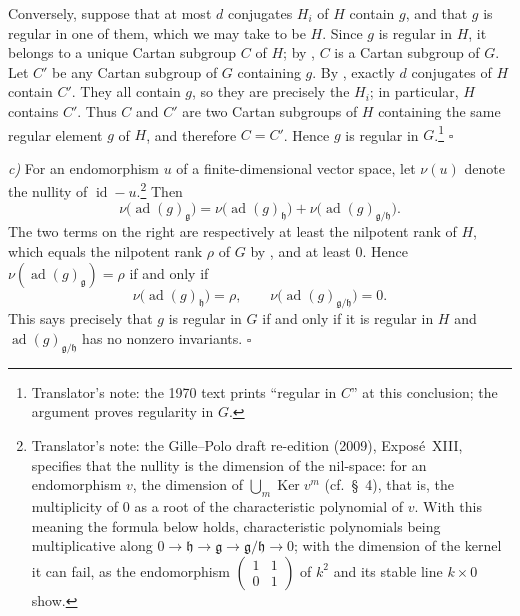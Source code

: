 Conversely, suppose that at most \(d\) conjugates \(H_i\) of \(H\)
contain \(g\), and that \(g\) is regular in one of them, which we may
take to be \(H\). Since \(g\) is regular in \(H\), it belongs to a
unique Cartan subgroup \(C\) of \(H\); by , \(C\) is a Cartan
subgroup of \(G\). Let \(C'\) be any Cartan subgroup of \(G\)
containing \(g\). By , exactly \(d\) conjugates of \(H\)
contain \(C'\). They all contain \(g\), so they are precisely the
\(H_i\); in particular, \(H\) contains \(C'\). Thus \(C\) and \(C'\)
are two Cartan subgroups of \(H\) containing the same regular element
\(g\) of \(H\), and therefore \(C=C'\). Hence \(g\) is regular in
\(G\).\footnote{Translator's note: the 1970 text prints ``regular in
\(C\)'' at this conclusion; the argument proves regularity in \(G\).}
\hfill\(\square\)

\textit{c)} For an endomorphism \(u\) of a finite-dimensional vector
space, let \(\nu(u)\) denote the nullity of
\(\operatorname{id}-u\).\footnote{Translator's note: the Gille--Polo draft
re-edition (2009), Exposé~XIII, specifies that the nullity is the
dimension of the nil-space: for an endomorphism \(v\), the dimension of
\(\bigcup_m\operatorname{Ker}v^m\) (cf.\ \S~4), that is, the multiplicity
of \(0\) as a root of the characteristic polynomial of \(v\). With this
meaning the formula below holds, characteristic polynomials being
multiplicative along
\(0\to\mathfrak h\to\mathfrak g\to\mathfrak g/\mathfrak h\to0\); with the
dimension of the kernel it can fail, as the endomorphism
\(\left(\begin{smallmatrix}1&1\\0&1\end{smallmatrix}\right)\) of \(k^2\)
and its stable line \(k\times0\) show.} Then
\[
  \nu\bigl(\operatorname{ad}(g)_{\mathfrak g}\bigr)
  =
  \nu\bigl(\operatorname{ad}(g)_{\mathfrak h}\bigr)
  +
  \nu\bigl(\operatorname{ad}(g)_{\mathfrak g/\mathfrak h}\bigr).
\]
The two terms on the right are respectively at least the nilpotent
rank of \(H\), which equals the nilpotent rank \(\rho\) of \(G\) by
, and at least \(0\). Hence
\(\nu(\operatorname{ad}(g)_{\mathfrak g})=\rho\) if and only if
\[
  \nu\bigl(\operatorname{ad}(g)_{\mathfrak h}\bigr)=\rho,
  \qquad
  \nu\bigl(\operatorname{ad}(g)_{\mathfrak g/\mathfrak h}\bigr)=0.
\]
This says precisely that \(g\) is regular in \(G\) if and only if it
is regular in \(H\) and
\(\operatorname{ad}(g)_{\mathfrak g/\mathfrak h}\) has no nonzero
invariants. \hfill\(\square\)

